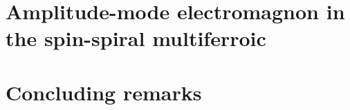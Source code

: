 \documentclass[
    letterpaper,
    12pt,
    openbib,
]{memoir}
\begin{document}
\frontmatter*


\acknowledgements

\clearpage
\preface

\clearpage

\tableofcontents
\clearpage
\listoffigures
\clearpage
\listoftables
\clearpage

\mainmatter*
% 
% 
% 
% 
% 
% 
\chapter{Amplitude-mode electromagnon in the spin-spiral multiferroic }\label{ch:cubr2}

\chapter{Concluding remarks}\label{ch:conclusion}

\backmatter*

\end{document}
